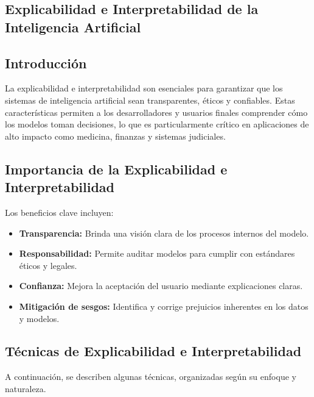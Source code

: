 \begin{refsection}
\chapter{Explicabilidad e Interpretabilidad de la Inteligencia Artificial}
\label{chapter:chapter-3}

\section{Introducción}
La explicabilidad e interpretabilidad son esenciales para garantizar que los sistemas de inteligencia artificial sean transparentes, éticos y confiables. Estas características permiten a los desarrolladores y usuarios finales comprender cómo los modelos toman decisiones, lo que es particularmente crítico en aplicaciones de alto impacto como medicina, finanzas y sistemas judiciales.

\section{Importancia de la Explicabilidad e Interpretabilidad}
Los beneficios clave incluyen:
\begin{itemize}
    \item \textbf{Transparencia:} Brinda una visión clara de los procesos internos del modelo.
    \item \textbf{Responsabilidad:} Permite auditar modelos para cumplir con estándares éticos y legales.
    \item \textbf{Confianza:} Mejora la aceptación del usuario mediante explicaciones claras.
    \item \textbf{Mitigación de sesgos:} Identifica y corrige prejuicios inherentes en los datos y modelos.
\end{itemize}

\section{Técnicas de Explicabilidad e Interpretabilidad}

A continuación, se describen algunas técnicas, organizadas según su enfoque y naturaleza.


\end{refsection}
